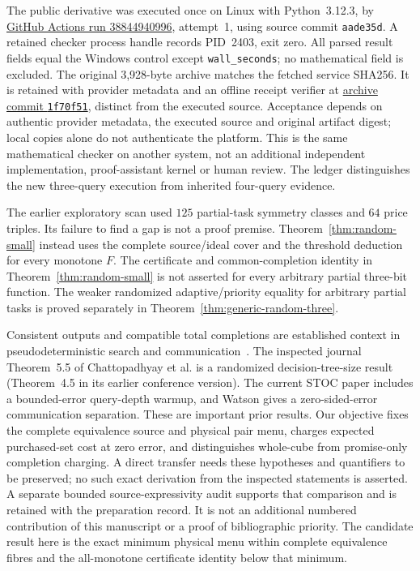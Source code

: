 \documentclass[pdflatex,sn-mathphys-num]{sn-jnl}
\theoremstyle{thmstyleone}
\theoremstyle{thmstylethree}
\theoremstyle{thmstyletwo}
\begin{document}
The public derivative was executed once on Linux with Python~3.12.3, by \href{https://github.com/SHiJiE1115/newproj/actions/runs/38844940996}{GitHub Actions run 38844940996}, attempt~1, using source commit \texttt{aade35d}. A retained checker process handle records PID~2403, exit zero. All parsed result fields equal the Windows control except \texttt{wall\_seconds}; no mathematical field is excluded. The original 3,928-byte archive matches the fetched service SHA256. It is retained with provider metadata and an offline receipt verifier at \href{https://github.com/SHiJiE1115/newproj/tree/1f70f518aa56f6ed368ce8d02fab5cbeb5ee3dc9/evidence/small_menu_hosted_v01}{archive commit \texttt{1f70f51}}, distinct from the executed source. Acceptance depends on authentic provider metadata, the executed source and original artifact digest; local copies alone do not authenticate the platform. This is the same mathematical checker on another system, not an additional independent implementation, proof-assistant kernel or human review. The ledger distinguishes the new three-query execution from inherited four-query evidence.

The earlier exploratory scan used $125$ partial-task symmetry classes and $64$ price triples. Its failure to find a gap is not a proof premise. Theorem~\ref{thm:random-small} instead uses the complete source/ideal cover and the threshold deduction for every monotone $F$. The certificate and common-completion identity in Theorem~\ref{thm:random-small} is not asserted for every arbitrary partial three-bit function. The weaker randomized adaptive/priority equality for arbitrary partial tasks is proved separately in Theorem~\ref{thm:generic-random-three}.

Consistent outputs and compatible total completions are established context in pseudodeterministic search and communication~\cite{chattopadhyay2025pseudo,goos2026pseudo,watson2026pseudo}. The inspected journal Theorem~5.5 of Chattopadhyay et al. is a randomized decision-tree-size result (Theorem~4.5 in its earlier conference version). The current STOC paper includes a bounded-error query-depth warmup, and Watson gives a zero-sided-error communication separation. These are important prior results. Our objective fixes the complete equivalence source and physical pair menu, charges expected purchased-set cost at zero error, and distinguishes whole-cube from promise-only completion charging. A direct transfer needs these hypotheses and quantifiers to be preserved; no such exact derivation from the inspected statements is asserted. A separate bounded source-expressivity audit supports that comparison and is retained with the preparation record. It is not an additional numbered contribution of this manuscript or a proof of bibliographic priority. The candidate result here is the exact minimum physical menu within complete equivalence fibres and the all-monotone certificate identity below that minimum.
\end{document}
